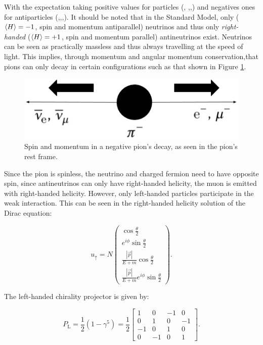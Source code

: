 With the expectation taking positive values for particles (\Pelectron, \Pmuon,\Pnue,\Pnum) and negatives ones for antiparticles (\APelectron,\APmuon,\APnue,\APnum). It should be noted that in the Standard Model, only  ($\Braket{H}=-1$, spin and momentum antiparallel) neutrinos and thus only \textit{right-handed} ($\Braket{H}=+1$, spin and momentum parallel) antineutrinos exist. Neutrinos can be seen as practically massless and thus always travelling at the speed of light. This implies, through momentum and angular momentum conservation,that pions can only decay in certain configurations such as that shown in Figure \ref{fig:helipi}.

\begin{figure}[htbp]
\centering
\includegraphics[width=0.7\linewidth]{./fig/helipi2.png}
\caption{Spin and momentum in a negative pion's decay, as seen in the pion's rest frame.}
\label{fig:helipi}
\end{figure}

Since the pion is spinless, the neutrino and charged fermion need to have opposite spin, since antineutrinos can only have right-handed helicity, the muon is emitted with right-handed helicity. However, only left-handed particles participate in the weak interaction. This can be seen in the right-handed helicity solution of the Dirac equation:

\begin{equation}
u_{\uparrow}=N\begin{pmatrix} \cos{\frac{\theta}{2}} \\ e^{i\phi}\sin{\frac{\theta}{2}} \\ \frac{|\vec{p}|}{E+m}\cos{\frac{\theta}{2}} \\ \frac{|\vec{p}|}{E+m}e^{i\phi}\sin{\frac{\theta}{2}} \end{pmatrix}.
\end{equation}

The left-handed chirality projector is given by:

\begin{equation}
P_{\text{L}}=\frac{1}{2}(1-\gamma^5)=\frac{1}{2} \begin{bmatrix} 1 & 0 & -1 & 0 \\
0 & 1 & 0 & -1 \\
-1 & 0 & 1 & 0 \\
0 & -1 & 0 & 1 \end{bmatrix}.
\end{equation} 

